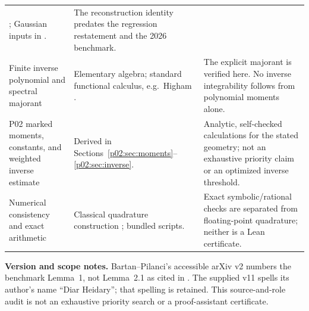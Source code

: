 \documentclass[11pt]{article}
\numberwithin{equation}{section}
\theoremstyle{definition}\newtheorem{definition}[theorem]{Definition}
\theoremstyle{remark}\newtheorem{remark}[theorem]{Remark}
\begin{document}
\begin{longtable}{@{}P{.24\textwidth}P{.39\textwidth}P{.31\textwidth}@{}}
\cite[Lemma~1, arXiv v2]{BP2020}; Gaussian inputs in \cite{HMT}. &
The reconstruction identity predates the regression restatement and the 2026 benchmark.\\
Finite inverse polynomial and spectral majorant &
Elementary algebra; standard functional calculus, e.g.\ Higham \cite{Higham}. &
The explicit majorant is verified here. No inverse integrability follows
from polynomial moments alone.\\
P02 marked moments, constants, and weighted inverse estimate &
Derived in Sections~\ref{p02:sec:moments}--\ref{p02:sec:inverse}. &
Analytic, self-checked calculations for the stated geometry; not an exhaustive
priority claim or an optimized inverse threshold.\\
Numerical consistency and exact arithmetic &
Classical quadrature construction \cite{GolubWelsch}; bundled scripts. &
Exact symbolic/rational checks are separated from floating-point quadrature;
neither is a Lean certificate.\\
\bottomrule
\end{longtable}
\endgroup

\textbf{Version and scope notes.}
Bartan--Pilanci's accessible arXiv v2 numbers the benchmark Lemma~1,
not Lemma~2.1 as cited in \cite{EW}. The supplied v11 spells its author's
name ``Diar Heidary''; that spelling is retained. This source-and-role audit
is not an exhaustive priority search or a proof-assistant certificate.
\end{document}
